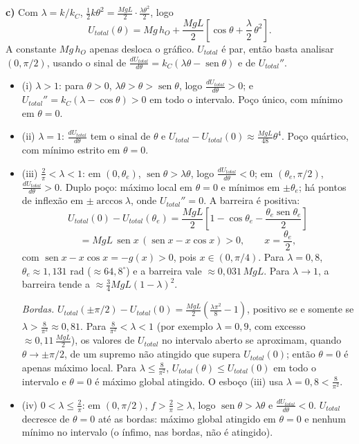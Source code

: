 \documentclass{article}%
\begin{document}
\textbf{c)} Com $\lambda=k/k_C$, $\frac{1}{2}k\theta^2=\frac{MgL}{2}\cdot\frac{\lambda\theta^2}{2}$, logo
\[
U_{total}(\theta)=Mg\,h_O+\frac{MgL}{2}\left[\cos\theta+\frac{\lambda}{2}\,\theta^2\right].
\]
A constante $Mg\,h_O$ apenas desloca o gráfico. $U_{total}$ é par, então basta analisar $(0,\pi/2)$, usando o sinal de $\frac{dU_{total}}{d\theta}=k_C(\lambda\theta-\operatorname{sen}\theta)$ e de $U_{total}''$.
\begin{itemize}
\item (i) $\lambda>1$: para $\theta>0$, $\lambda\theta>\theta>\operatorname{sen}\theta$, logo $\frac{dU_{total}}{d\theta}>0$; e $U_{total}''=k_C(\lambda-\cos\theta)>0$ em todo o intervalo. Poço único, com mínimo em $\theta=0$.
\item (ii) $\lambda=1$: $\frac{dU_{total}}{d\theta}$ tem o sinal de $\theta$ e $U_{total}-U_{total}(0)\approx\frac{MgL}{48}\theta^4$. Poço quártico, com mínimo estrito em $\theta=0$.
\item (iii) $\frac{2}{\pi}<\lambda<1$: em $(0,\theta_e)$, $\operatorname{sen}\theta>\lambda\theta$, logo $\frac{dU_{total}}{d\theta}<0$; em $(\theta_e,\pi/2)$, $\frac{dU_{total}}{d\theta}>0$. Duplo poço: máximo local em $\theta=0$ e mínimos em $\pm\theta_e$; há pontos de inflexão em $\pm\arccos\lambda$, onde $U_{total}''=0$. A barreira é positiva:
\[
U_{total}(0)-U_{total}(\theta_e)=\frac{MgL}{2}\left[1-\cos\theta_e-\frac{\theta_e\operatorname{sen}\theta_e}{2}\right]
\]
\[
=MgL\,\operatorname{sen}x\,(\operatorname{sen}x-x\cos x)>0,\qquad x=\frac{\theta_e}{2},
\]
com $\operatorname{sen}x-x\cos x=-g(x)>0$, pois $x\in(0,\pi/4)$. Para $\lambda=0{,}8$, $\theta_e\approx 1{,}131$ rad ($\approx 64{,}8^\circ$) e a barreira vale $\approx 0{,}031\,MgL$. Para $\lambda\to 1$, a barreira tende a $\approx\frac{3}{4}MgL(1-\lambda)^2$.

\textit{Bordas.} $U_{total}(\pm\pi/2)-U_{total}(0)=\frac{MgL}{2}\left(\frac{\lambda\pi^2}{8}-1\right)$, positivo se e somente se $\lambda>\frac{8}{\pi^2}\approx 0{,}81$. Para $\frac{8}{\pi^2}<\lambda<1$ (por exemplo $\lambda=0{,}9$, com excesso $\approx 0{,}11\,\frac{MgL}{2}$), os valores de $U_{total}$ no intervalo aberto se aproximam, quando $\theta\to\pm\pi/2$, de um supremo não atingido que supera $U_{total}(0)$; então $\theta=0$ é apenas máximo local. Para $\lambda\le\frac{8}{\pi^2}$, $U_{total}(\theta)\le U_{total}(0)$ em todo o intervalo e $\theta=0$ é máximo global atingido. O esboço (iii) usa $\lambda=0{,}8<\frac{8}{\pi^2}$.
\item (iv) $0<\lambda\le\frac{2}{\pi}$: em $(0,\pi/2)$, $f>\frac{2}{\pi}\ge\lambda$, logo $\operatorname{sen}\theta>\lambda\theta$ e $\frac{dU_{total}}{d\theta}<0$. $U_{total}$ decresce de $\theta=0$ até as bordas: máximo global atingido em $\theta=0$ e nenhum mínimo no intervalo (o ínfimo, nas bordas, não é atingido).
\end{itemize}
\end{document}
